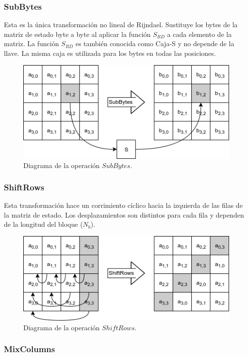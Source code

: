 \subsubsection{SubBytes}

Esta es la única transformación no lineal de Rijndael. Sustituye
los bytes de la matriz de estado byte a byte al aplicar la función
$S_{RD}$ a cada elemento de la matriz. La función $S_{RD}$ es también
conocida como Caja-S y no depende de la llave. La misma caja es utilizada
para los bytes en todas las posiciones.

\begin{figure}[H]
  \begin{center}
    \includegraphics[width=0.6\linewidth]{diagramas/subBytes}
    \caption{Diagrama de la operación $SubBytes$.}
   \end{center}
\end{figure}


\subsubsection{ShiftRows}

Esta transformación hace un corrimiento cíclico hacia la izquierda de las
filas de la matriz de estado. Los desplazamientos son distintos para cada
fila y dependen de la longitud del bloque ($N_b$).

\begin{figure}[H]
  \begin{center}
    \includegraphics[width=0.6\linewidth]{diagramas/shiftRows}
    \caption{Diagrama de la operación $ShiftRows$.}
   \end{center}
\end{figure}


\subsubsection{MixColumns}

